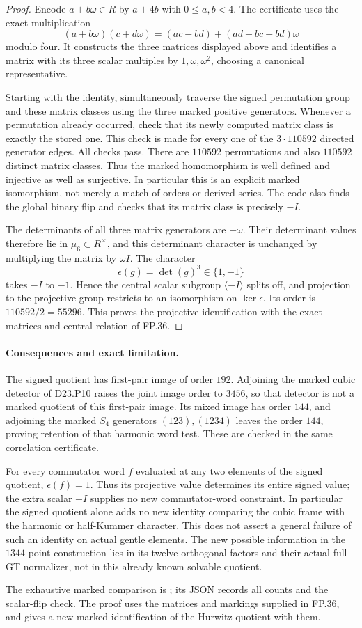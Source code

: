 \begin{proof}
Encode $a+b\omega\in R$ by $a+4b$ with $0\leq a,b<4$.
The certificate uses the exact multiplication
\[
 (a+b\omega)(c+d\omega)
     =(ac-bd)+(ad+bc-bd)\omega
\]
modulo four. It constructs the three matrices displayed
above and identifies a matrix with its three scalar multiples
by $1,\omega,\omega^2$, choosing a canonical representative.

Starting with the identity, simultaneously traverse the signed
permutation group and these matrix classes using the three
marked positive generators. Whenever a permutation already
occurred, check that its newly computed matrix class is
exactly the stored one. This check is made for every one of
the $3\cdot110592$ directed generator edges. All checks pass.
There are $110592$ permutations and also $110592$ distinct
matrix classes. Thus the marked homomorphism is well defined
and injective as well as surjective. In particular this is an
explicit marked isomorphism, not merely a match of orders or
derived series. The code also finds the global binary flip
and checks that its matrix class is precisely $-I$.

The determinants of all three matrix generators are $-\omega$.
Their determinant values therefore lie in $\mu_6\subset R^\times$,
and this determinant character is unchanged by multiplying
the matrix by $\omega I$. The character
\[
                 \epsilon(g)=\det(g)^3\in\{1,-1\}
\]
takes $-I$ to $-1$. Hence the central scalar subgroup
$\langle-I\rangle$ splits off, and projection to the
projective group restricts to an isomorphism on
$\ker\epsilon$. Its order is $110592/2=55296$.
This proves the projective identification with the exact
matrices and central relation of FP.36.
\end{proof}

\paragraph{Consequences and exact limitation.}
The signed quotient has first-pair image of order $192$.
Adjoining the marked cubic detector of D23.P10 raises the
joint image order to $3456$, so that detector is not a marked
quotient of this first-pair image. Its mixed image has order
$144$, and adjoining the marked $S_4$ generators
$(123),(1234)$ leaves the order $144$, proving retention of
that harmonic word test. These are checked in the same
correlation certificate.

For every commutator word $f$ evaluated at any two elements of
the signed quotient, $\epsilon(f)=1$. Thus its projective
value determines its entire signed value; the extra scalar
$-I$ supplies no new commutator-word constraint. In particular
the signed quotient alone adds no new identity comparing
the cubic frame with the harmonic or half-Kummer character.
This does not assert a general failure of such an identity on
actual gentle elements. The new possible information in the
$1344$-point construction lies in its twelve orthogonal
factors and their actual full-GT normalizer, not in this
already known solvable quotient.

The exhaustive marked comparison is
; its
JSON records all counts and the scalar-flip check. The proof
uses the matrices and markings supplied in FP.36, and gives
a new marked identification of the Hurwitz quotient with them.
